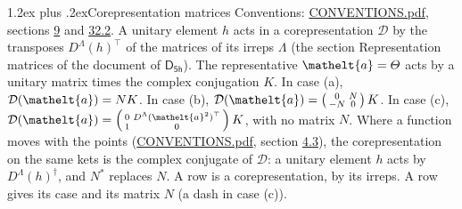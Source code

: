 \documentclass[10pt,a4paper]{article}
\makeatletter
\renewcommand\section{\@startsection{section}{1}{\z@}{-3ex plus -1ex minus -.2ex}%
  {1.2ex plus .2ex}{\normalfont\large\sffamily\bfseries\color{parttitle}}}
\numberwithin{equation}{section}
\newcommand{\eltfont}[1]{{\let\sigma\eltsigma\mathelt{#1}}}
\newcommand{\grp}[1]{\mathsf{#1}}
\newcommand{\elt}[1]{\eltfont{#1}}
\makeatother
\begin{document}
\section{Corepresentation matrices}\label{s:corep_matrices}
Conventions: \href{../../CONVENTIONS.pdf}{CONVENTIONS.pdf}, sections \href{../../../rotation/CONVENTIONS.pdf\#conv.9}{9} and \href{../../CONVENTIONS.pdf\#conv.32.2}{32.2}.
A unitary element $h$ acts in a corepresentation $\mathcal{D}$ by the transposes $D^{\Lambda}(h)^{\top}$ of the matrices of its irreps $\Lambda$ (the section Representation matrices of the document of \href{../../../rotation/data/pdf/D5h.pdf}{$\grp{D_{5h}}$}). The representative $\elt{a} = \varTheta$ acts by a unitary matrix times the complex conjugation $K$.
In case (a), $\mathcal{D}(\elt{a}) = NK$. In case (b), $\mathcal{D}(\elt{a}) = \left(\begin{smallmatrix} 0 & N \\ -N & 0 \end{smallmatrix}\right) K$. In case (c), $\mathcal{D}(\elt{a}) = \left(\begin{smallmatrix} 0 & D^{\Lambda}(\elt{a}^2)^{\top} \\ 1 & 0 \end{smallmatrix}\right) K$, with no matrix $N$.
Where a function moves with the points (\href{../../CONVENTIONS.pdf}{CONVENTIONS.pdf}, section \href{../../../rotation/CONVENTIONS.pdf\#conv.4.3}{4.3}), the corepresentation on the same kets is the complex conjugate of $\mathcal{D}$: a unitary element $h$ acts by $D^{\Lambda}(h)^{\dagger}$, and $N^{*}$ replaces $N$.
A row is a corepresentation, by its irreps. A row gives its case and its matrix $N$ (a dash in case (c)).
\end{document}
